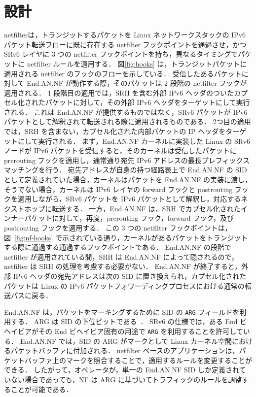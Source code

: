 \section{設計}
\label{section:design}
netfilterは，トランジットするパケットを Linux ネットワークスタックの IPv6 パケット転送フローに既に存在する netfilter フックポイントを通過させ，かつ SRv6 レイヤに 3 つの netfilter フックポイントを持ち，異なるタイミングでパケットに netfilter ルールを適用する．
図\ref*{fig:hooks} は，トランジットパケットに適用される netfilter のフックのフローを示している．
受信したあるパケットに対して End.AN.NF が動作する際，そのパケットは 2 段階の netfilter フックが適用される．
1 段階目の適用では，SRH を含む外部 IPv6 ヘッダのついたカプセル化されたパケットに対して，その外部 IPv6 ヘッダをターゲットにして実行される．
これは End.AN.NF が提供するものではなく，SRv6 パケットが IPv6 パケットとして解釈されて転送される際に適用されるものである．
2つ目の適用では，SRH を含まない，カプセル化された内部パケットの IP ヘッダをターゲットにして実行される．
まず，End.AN.NF カーネルに実装した Linux の SRv6 ノードが IPv6 パケットを受信すると，そのカーネルは受信したパケットに prerouting フックを適用し，通常通り宛先 IPv6 アドレスの最長プレフィックスマッチングを行う．
宛先アドレスが自身の持つ経路表上で End.AN.NF の SID として定義されていた場合，カーネルはパケットを End.AN.NF の実装に渡し，そうでない場合，カーネルは IPv6 レイヤの forward フックと postrouting フックを適用しながら，SRv6 パケットを IPv6 パケットとして解釈し，対応するネクストホップに転送する．
一方，End.AN.NF は，SRH でカプセル化されたインナーパケットに対して，再度，prerouting フック，forward フック，及び postrouting フックを適用する．
この 3 つの netfilter フックポイントは，図~\ref*{fig:nf-hooks} で示されている通り，カーネルがあるパケットをトランジットする際に通過する通過するフックポイントである．
End.AN.NF の段階で netfilter が適用されている間，SRH は End.AN.NF によって隠されるので，netfilter は SRH の処理を考慮する必要がない．
End.AN.NF が終了すると，外部 IPv6 ヘッダの宛先アドレスは次の SID に置き換えられ，カプセル化されたパケットは Linux の IPv6 パケットフォワーディングプロセスにおける通常の転送パスに戻る．

End.AN.NF は，パケットをマーキングするために SID の \texttt{ARG} フィールドを利用する．
ARG は SID の下位ビットである~\cite{rfc8986}．
SRv6 の仕様では，ある End ビヘイビアがその End ビヘイビア固有の用途で \texttt{ARG} を利用することを許可している．
End.AN.NF では，SID の ARG がマークとして Linux カーネル空間におけるパケットバッファに付加される．
netfilter ベースのアプリケーションは，パケットバッファ上のマークを照合することで，適用するルールを変更することができる．
したがって，オペレータが，単一の End.AN.NF SID しか定義されていない場合であっても，NF は ARG に基づいてトラフィックのルールを調整することが可能である．

